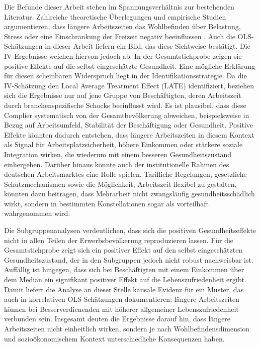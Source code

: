 \documentclass[12pt,a4paper]{article}
\begin{document}
Die Befunde dieser Arbeit stehen im Spannungsverhältnis zur bestehenden Literatur. Zahlreiche theoretische Überlegungen und empirische Studien argumentieren, dass längere Arbeitszeiten das Wohlbefinden über Belastung, Stress oder eine Einschränkung der Freizeit negativ beeinflussen \parencite{cyganrehm2018, berniell2020}. Auch die OLS-Schätzungen in dieser Arbeit liefern ein Bild, das diese Sichtweise bestätigt. Die IV-Ergebnisse weichen hiervon jedoch ab. In der Gesamtstichprobe zeigen sie positive Effekte auf die selbst eingeschätzte Gesundheit. Eine mögliche Erklärung für diesen scheinbaren Widerspruch liegt in der Identifikationsstrategie. Da die IV-Schätzung den Local Average Treatment Effect (LATE) identifiziert, beziehen sich die Ergebnisse nur auf jene Gruppe von Beschäftigten, deren Arbeitszeit durch branchenspezifische Schocks beeinflusst wird. Es ist plausibel, dass diese Complier systematisch von der Gesamtbevölkerung abweichen, beispielsweise in Bezug auf Arbeitsumfeld, Stabilität der Beschäftigung oder Gesundheit. Positive Effekte könnten dadurch entstehen, dass längere Arbeitszeiten in diesem Kontext als Signal für Arbeitsplatzsicherheit, höhere Einkommen oder stärkere soziale Integration wirken, die wiederum mit einem besseren Gesundheitszustand einhergehen. Darüber hinaus könnte auch der institutionelle Rahmen des deutschen Arbeitsmarktes eine Rolle spielen. Tarifliche Regelungen, gesetzliche Schutzmechanismen sowie die Möglichkeit, Arbeitszeit flexibel zu gestalten, könnten dazu beitragen, dass Mehrarbeit nicht zwangsläufig gesundheitsschädlich wirkt, sondern in bestimmten Konstellationen sogar als vorteilhaft wahrgenommen wird. 

Die Subgruppenanalysen verdeutlichen, dass sich die positiven Gesundheitseffekte nicht in allen Teilen der Erwerbsbevölkerung reproduzieren lassen. Für die Gesamtstichprobe zeigt sich ein positiver Effekt auf den selbst eingeschätzten Gesundheitszustand, der in den Subgruppen jedoch nicht robust nachweisbar ist. Auffällig ist hingegen, dass sich bei Beschäftigten mit einem Einkommen über dem Median ein signifikant positiver Effekt auf die Lebenszufriedenheit ergibt. Damit liefert die Analyse an dieser Stelle kausale Evidenz für ein Muster, das auch \textcite{holly2012} in korrelativen OLS-Schätzungen dokumentieren: längere Arbeitszeiten können bei Besserverdienenden mit höherer allgemeiner Lebenszufriedenheit verbunden sein. Insgesamt deuten die Ergebnisse darauf hin, dass längere Arbeitszeiten nicht einheitlich wirken, sondern je nach Wohlbefindensdimension und sozioökonomischem Kontext unterschiedliche Konsequenzen haben.
\end{document}
